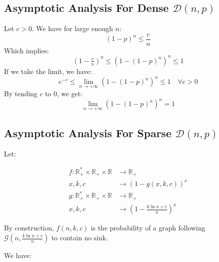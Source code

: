 \subsection{Asymptotic Analysis For Dense $\mathcal{D}(n,p)$}
Let $c>0.$ We have for large enough $n$:
$$
(1-p)^n \le \frac{c}{n}
$$
Which implies:
$$
(1-\tfrac{c}{n})^n \le (1-(1-p)^n)^n \le 1
$$
If we take the limit, we have:
$$
  e^{-c}\le \lim_{n\rightarrow +\infty}  (1-(1-p)^n)^n \le 1 \quad \forall c>0 
$$
By tending $c$ to $0$, we get:
$$
\lim_{n\rightarrow +\infty} (1-(1-p)^n)^n=1
$$
\subsection{Asymptotic Analysis For Sparse $\mathcal{D}(n,p)$}
Let:

\begin{align*}
	f:\mathbb{R}_+^*\times \mathbb{R}_+\times \mathbb{R} & \rightarrow \mathbb{R}_+\\
	x,k,c&\rightarrow (1-g(x,k,c))^x\\
	g:\mathbb{R}_+^*\times \mathbb{R}_+\times \mathbb{R} & \rightarrow \mathbb{R}_+\\
	x,k,c&\rightarrow \left(1-\frac{k \ln x+c}{x}\right)^x
\end{align*}

By construction, $f(n,k,c)$ is the probability of a graph following $\mathcal{G}(n,\tfrac{k\ln n+c}{n})$ to contain no sink.

We have:

